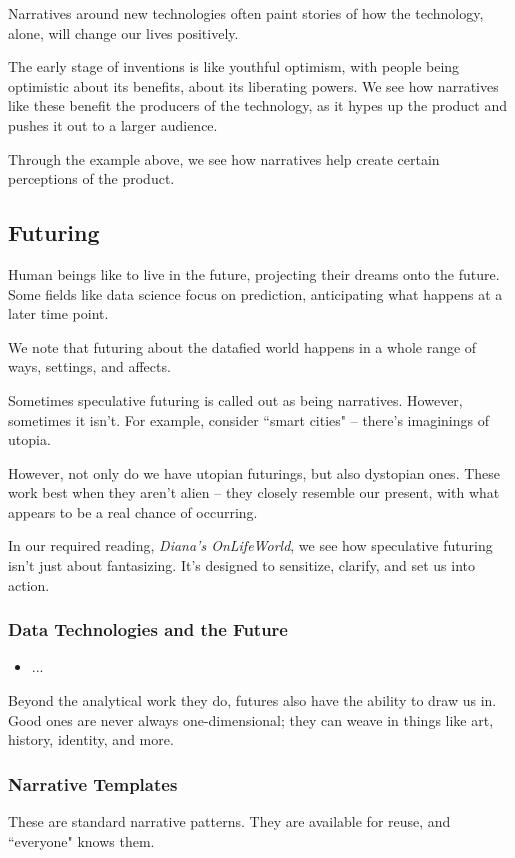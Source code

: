 \documentclass[openany]{book}
\begin{document}
Narratives around new technologies often paint stories of how the technology, alone, will change our lives positively.

The early stage of inventions is like youthful optimism, with people being optimistic about its benefits, about its liberating powers. We see how narratives like these benefit the producers of the technology, as it hypes up the product and pushes it out to a larger audience.

Through the example above, we see how narratives help create certain perceptions of the product.

\subsection{Futuring}
Human beings like to live in the future, projecting their dreams onto the future. Some fields like data science focus on prediction, anticipating what happens at a later time point.

We note that futuring about the datafied world happens in a whole range of ways, settings, and affects.

Sometimes speculative futuring is called out as being narratives. However, sometimes it isn't. For example, consider ``smart cities" -- there's imaginings of utopia.

However, not only do we have utopian futurings, but also dystopian ones. These work best when they aren't alien -- they closely resemble our present, with what appears to be a real chance of occurring.

In our required reading, \textit{Diana's OnLifeWorld}, we see how speculative futuring isn't just about fantasizing. It's designed to sensitize, clarify, and set us into action.

\subsubsection{Data Technologies and the Future}
\begin{itemize}
	\item ...
\end{itemize}

Beyond the analytical work they do, futures also have the ability to draw us in. Good ones are never always one-dimensional; they can weave in things like art, history, identity, and more.

\subsubsection{Narrative Templates}
These are standard narrative patterns. They are available for reuse, and ``everyone" knows them.
\end{document}
